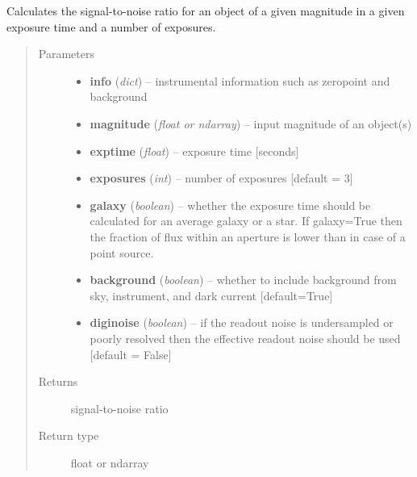 \documentclass[a4paper,12pt,english]{sphinxmanual}
\begin{document}
\begin{fulllineitems}
\label{ETC:analysis.ETC.SNR}
Calculates the signal-to-noise ratio for an object of a given magnitude in a given exposure time and a
number of exposures.
\begin{quote}\begin{description}
\item[{Parameters}] \leavevmode\begin{itemize}
\item {} 
\textbf{info} (\emph{dict}) -- instrumental information such as zeropoint and background

\item {} 
\textbf{magnitude} (\emph{float or ndarray}) -- input magnitude of an object(s)

\item {} 
\textbf{exptime} (\emph{float}) -- exposure time {[}seconds{]}

\item {} 
\textbf{exposures} (\emph{int}) -- number of exposures {[}default = 3{]}

\item {} 
\textbf{galaxy} (\emph{boolean}) -- whether the exposure time should be calculated for an average galaxy or a star.
If galaxy=True then the fraction of flux within an aperture is lower than in case of a point source.

\item {} 
\textbf{background} (\emph{boolean}) -- whether to include background from sky, instrument, and dark current {[}default=True{]}

\item {} 
\textbf{diginoise} (\emph{boolean}) -- if the readout noise is undersampled or poorly resolved then the effective readout noise
should be used {[}default = False{]}

\end{itemize}

\item[{Returns}] \leavevmode
signal-to-noise ratio

\item[{Return type}] \leavevmode
float or ndarray

\end{description}\end{quote}

\end{fulllineitems}
\end{document}
